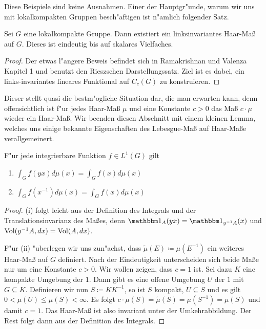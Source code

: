 	Diese Beispiele sind keine Ausnahmen.
	Einer der Hauptgr"unde, warum wir uns mit lokalkompakten Gruppen besch"aftigen ist n"amlich folgender Satz.
	\begin{satz}
	\label{satz:topo:haarmeasure}
		Sei $G$ eine lokalkompakte Gruppe. Dann existiert ein linksinvariantes Haar-Maß auf $G$. Dieses ist eindeutig bis auf skalares Vielfaches.
	\end{satz}
	\begin{proof}
		Der etwas l"angere Beweis befindet sich in Ramakrishnan und Valenza \cite{rama} Kapitel 1 und benutzt den Rieszschen Darstellungssatz.
		Ziel ist es dabei, ein links-invariantes lineares Funktional auf $C_c(G)$ zu konstruieren.
	\end{proof}
	Dieser stellt quasi die bestm"ogliche Situation dar, die man erwarten kann, denn offensichtlich ist f"ur jedes Haar-Maß $\mu$ und eine Konstante $c>0$ das Maß $c\cdot \mu$ wieder ein Haar-Maß. 
	Wir beenden diesen Abschnitt mit einem kleinen Lemma, welches uns einige bekannte Eigenschaften des Lebesgue-Maß auf Haar-Maße verallgemeinert.
	\begin{lemma}F"ur jede integrierbare Funktion $f\in L^{1}(G)$ gilt
		\begin{enumerate}[label=\emph{(\roman*)}]
			\item $\int_{G} f(yx)d\mu(x) = \int_{G} f(x)d\mu(x)$
			\item $\int_{G} f(x^{-1})d\mu(x) = \int_{G} f(x)d\mu(x)$
		\end{enumerate}
	\end{lemma}
	\begin{proof}
		(i) folgt leicht aus der Definition des Integrals und der Translationsinvarianz des Maßes, denn $\ind_A(yx) = \ind_{y^{-1}A}(x)$ und $\text{Vol}({y^{-1}A}, d{x}) = \text{Vol}(A,d{x})$.
		
		F"ur (ii) "uberlegen wir uns zun"achst, dass $\tilde{\mu}(E)\coloneqq  \mu(E^{-1})$ ein weiteres Haar-Maß auf $G$ definiert. 
		Nach der Eindeutigkeit unterscheiden sich beide Maße nur um eine Konstante $c > 0$. Wir wollen zeigen, dass $c=1$ ist.
		Sei dazu $K$ eine kompakte Umgebung der $1$. Dann gibt es eine offene Umgebung $U$ der $1$ mit $G \subseteq K$. Definieren wir nun $S \coloneqq  KK^{-1}$, so ist $S$ kompakt, $U \subseteq S$ und es gilt $0 < \mu(U) \leq \mu(S)<\infty$. 
		Es folgt $ c\cdot \mu(S) = \tilde{\mu}(S) = \mu(S^{-1}) =\mu(S)$ und damit $c=1$. Das Haar-Maß ist also invariant unter der Umkehrabbildung. Der Rest folgt dann aus der Definition des Integrals.
	\end{proof}
	

